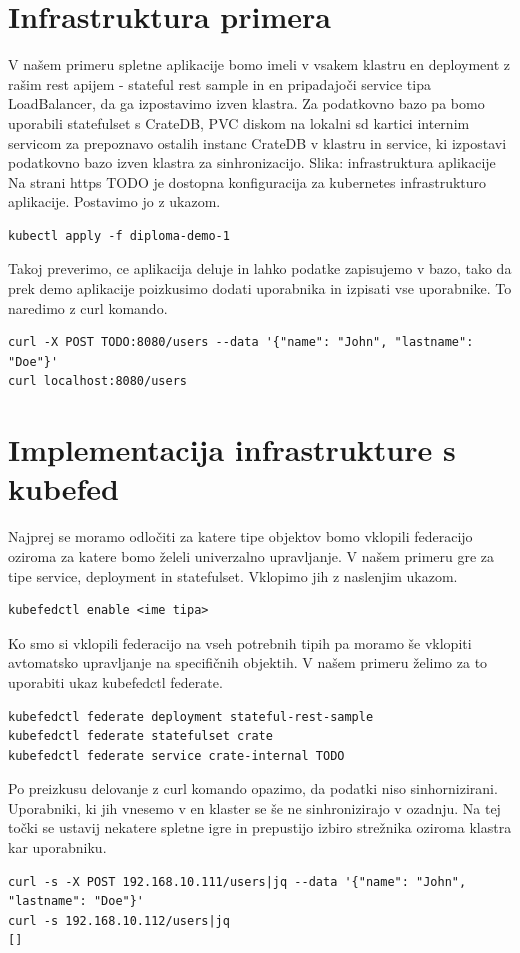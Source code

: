 \documentclass[a4paper, 12pt]{book}
\begin{document}
\section{Infrastruktura primera}
V našem primeru spletne aplikacije bomo imeli v vsakem klastru en deployment z rašim rest apijem - stateful rest sample in en pripadajoči service tipa LoadBalancer, da ga izpostavimo izven klastra.
Za podatkovno bazo pa bomo uporabili statefulset s CrateDB, PVC diskom na lokalni sd kartici internim servicom za prepoznavo ostalih instanc CrateDB v klastru in service, ki izpostavi podatkovno bazo izven klastra za sinhronizacijo.
Slika: infrastruktura aplikacije
Na strani https TODO je dostopna konfiguracija za kubernetes infrastrukturo aplikacije. Postavimo jo z ukazom.
\begin{verbatim}
kubectl apply -f diploma-demo-1
\end{verbatim}
Takoj preverimo, ce aplikacija deluje in lahko podatke zapisujemo v bazo, tako da prek demo aplikacije poizkusimo dodati uporabnika in izpisati vse uporabnike. To naredimo z curl komando.
\begin{verbatim}
curl -X POST TODO:8080/users --data '{"name": "John", "lastname": "Doe"}'
curl localhost:8080/users
\end{verbatim}
\section{Implementacija infrastrukture s kubefed}
Najprej se moramo odločiti za katere tipe objektov bomo vklopili federacijo oziroma za katere bomo želeli univerzalno upravljanje. V našem primeru gre za tipe service, deployment in statefulset. Vklopimo jih z naslenjim ukazom.
\begin{verbatim}
kubefedctl enable <ime tipa>
\end{verbatim}
Ko smo si vklopili federacijo na vseh potrebnih tipih pa moramo še vklopiti avtomatsko upravljanje na specifičnih objektih. V našem primeru želimo za to uporabiti ukaz kubefedctl federate.
\begin{verbatim}
kubefedctl federate deployment stateful-rest-sample
kubefedctl federate statefulset crate
kubefedctl federate service crate-internal TODO
\end{verbatim}
Po preizkusu delovanje z curl komando opazimo, da podatki niso sinhornizirani. Uporabniki, ki jih vnesemo v en klaster se še ne sinhronizirajo v ozadnju.
Na tej točki se ustavij nekatere spletne igre in prepustijo izbiro strežnika oziroma klastra kar uporabniku.
\begin{verbatim}
curl -s -X POST 192.168.10.111/users|jq --data '{"name": "John", "lastname": "Doe"}'
curl -s 192.168.10.112/users|jq
[]
\end{verbatim}
\end{document}
